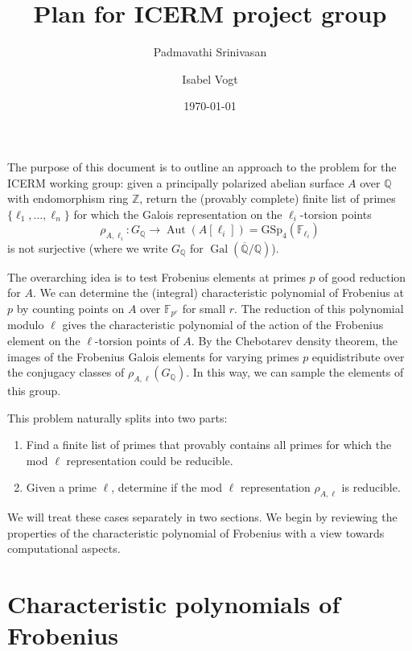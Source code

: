 \documentclass[11pt]{amsart}
\title{Plan for ICERM project group}
\author{Padmavathi Srinivasan}
\author{Isabel Vogt}
\date{\today}
\newcommand{\qq}{\mathbb{Q}}
\newcommand{\zz}{\mathbb{Z}}
\newcommand{\ff}{\mathbb{F}}
\newcommand{\GSp}{\text{GSp}}
\newcommand{\Gal}{\operatorname{Gal}}
\newcommand{\Aut}{\operatorname{Aut}}
\renewcommand{\bar}{\overline}
\theoremstyle{definition}
\theoremstyle{remark}
\begin{document}
\maketitle

The purpose of this document is to outline an approach to the problem for the ICERM working group: given a principally polarized abelian surface $A$ over $\qq$ with endomorphism ring $\zz$, return the (provably complete) finite list of primes $\{\ell_1, \dots, \ell_n\}$ for which the Galois representation on the $\ell_i$-torsion points
\[\rho_{A, \ell_i} \colon G_{\qq} \to \Aut\left(A[\ell_i]\right) = \GSp_{4}(\ff_{\ell_i}) \]
is not surjective (where we write $G_{\qq}$ for $\Gal\left(\bar{\qq}/\qq\right)$).  

The overarching idea is to test Frobenius elements at primes $p$ of good reduction for $A$.  We can determine the (integral) characteristic polynomial of Frobenius at $p$ by counting points on $A$ over $\ff_{p^r}$ for small $r$.    The reduction of this polynomial modulo $\ell$ gives the characteristic polynomial of the action of the Frobenius element on the $\ell$-torsion points of $A$.  By the Chebotarev density theorem, the images of the Frobenius Galois elements for varying primes $p$ equidistribute over the conjugacy classes of $\rho_{A, \ell}(G_{\qq})$.  In this way, we can sample the elements of this group.

This problem naturally splits into two parts:
\begin{enumerate}
\item Find a finite list of primes that provably contains all primes for which the mod $\ell$ representation could be reducible.
\item Given a prime $\ell$, determine if the mod $\ell$ representation $\rho_{A, \ell}$ is reducible.
\end{enumerate}
We will treat these cases separately in two sections.  We begin by reviewing the properties of the characteristic polynomial of Frobenius with a view towards computational aspects.


\section{Characteristic polynomials of Frobenius}
\end{document}
